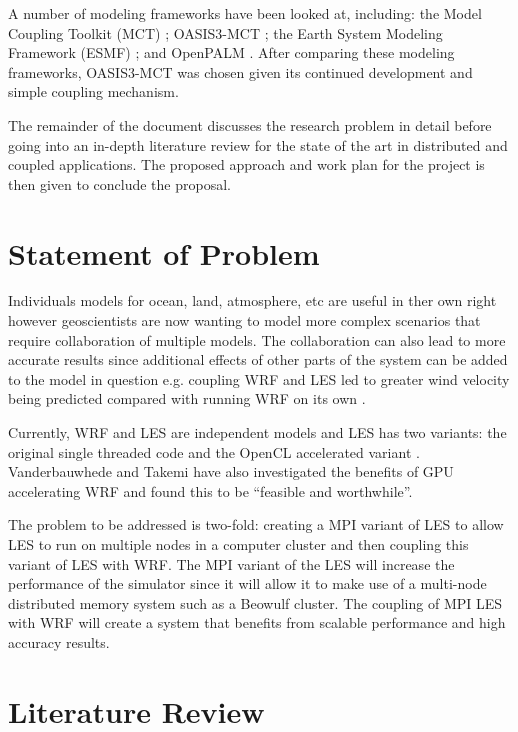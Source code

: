 \documentclass{acm_proc_article-sp}
\renewcommand{\_}{\underscore\hspace{0pt}}
\begin{document}
A number of modeling frameworks have been looked at, including: the Model
Coupling Toolkit (MCT) \cite{Larson2005,Jacob2005}; OASIS3-MCT
\cite{Valcke,Valcke2013}; the Earth System Modeling Framework (ESMF)
\cite{Ramework2004}; and OpenPALM \cite{Piacentini2011}. After comparing these
modeling frameworks, OASIS3-MCT was chosen given its continued development and
simple coupling mechanism.

The remainder of the document discusses the research problem in detail before
going into an in-depth literature review for the state of the art in distributed
and coupled applications. The proposed approach and work plan for the project is
then given to conclude the proposal.

\section*{Statement of Problem}

Individuals models for ocean, land, atmosphere, etc are useful in ther own right
however geoscientists are now wanting to model more complex scenarios that
require collaboration of multiple models. The collaboration can also lead to
more accurate results since additional effects of other parts of the system can
be added to the model in question e.g. coupling WRF and LES led to greater wind
velocity being predicted compared with running WRF on its own
\cite{Kinbara2010,Nakayama1998}.

Currently, WRF and LES are independent models and LES has two variants: the
original single threaded code and the OpenCL accelerated variant
\cite{Vanderbauwhede2014}. Vanderbauwhede and Takemi \cite{Vanderbauwhede2013}
have also investigated the benefits of GPU accelerating WRF and found this to be
``feasible and worthwhile''.

The problem to be addressed is two-fold: creating a MPI variant of LES to allow
LES to run on multiple nodes in a computer cluster and then coupling this
variant of LES with WRF. The MPI variant of the LES will increase the
performance of the simulator since it will allow it to make use of a multi-node
distributed memory system such as a Beowulf cluster. The coupling of MPI LES
with WRF will create a system that benefits from scalable performance and high
accuracy results.

\section*{Literature Review}
\end{document}
